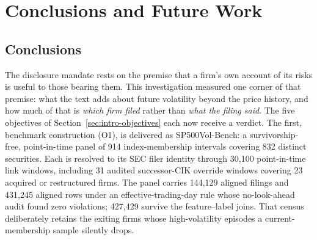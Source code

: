 \chapter{Conclusions and Future Work}
\label{ch:conclusions}

\section{Conclusions}
\label{sec:conc-verdicts}

The disclosure mandate rests on the premise that a firm's own account of its risks is useful to those bearing them. This investigation measured one corner of that premise: what the text adds about future volatility beyond the price history, and how much of that is \emph{which firm filed} rather than \emph{what the filing said}. The five objectives of Section~\ref{sec:intro-objectives} each now receive a verdict. The first, benchmark construction (O1), is delivered as SP500Vol-Bench: a survivorship-free, point-in-time panel of 914 index-membership intervals covering 832 distinct securities. %
Each is resolved to its SEC filer identity through 30,100 point-in-time link windows, %
including 31 audited successor-CIK override windows covering 23 acquired or restructured firms. %
The panel carries 144,129 aligned filings and 431,245 aligned rows under an effective-trading-day rule whose no-look-ahead audit found zero violations; 427,429 survive the feature--label joins. %
That census deliberately retains the exiting firms whose high-volatility episodes a current-membership sample silently drops.

